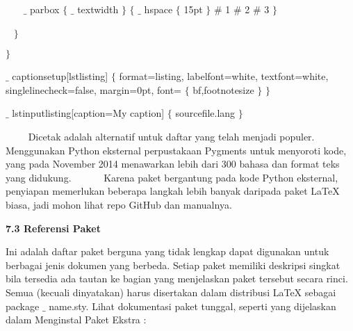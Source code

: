 {\fontsize{10pt}{10pt}\selectfont ~~~  $ \_ $ parbox $ \{ $  $ \_ $ textwidth $ \} $  $ \{ $  $ \_ $ hspace $ \{ $ 15pt $ \} $  $\#$ 1 $\#$ 2 $\#$ 3 $ \} $ }\par

{\fontsize{10pt}{10pt}\selectfont ~  $ \} $ }\par

{\fontsize{10pt}{10pt}\selectfont  $ \} $ }\par

{\fontsize{10pt}{10pt}\selectfont  $ \_ $ captionsetup[lstlisting] $ \{ $  format=listing, labelfont=white, textfont=white, singlelinecheck=false, margin=0pt, font= $ \{ $ bf,footnotesize $ \} $   $ \} $ }\par

{\fontsize{10pt}{10pt}\selectfont  $ \_ $ lstinputlisting[caption=My caption] $ \{ $ sourcefile.lang $ \} $ }\par


\noindent ~~~~ Dicetak adalah alternatif untuk daftar yang telah menjadi populer. Menggunakan Python eksternal perpustakaan Pygments untuk menyoroti kode, yang pada November 2014 menawarkan lebih dari 300 bahasa dan format teks yang didukung.~~~~~~ Karena paket bergantung pada kode Python eksternal, penyiapan memerlukan beberapa langkah lebih banyak daripada paket LaTeX biasa, jadi mohon lihat repo GitHub dan manualnya.\par

\vspace{12pt}
\noindent \textbf{7.3 Referensi Paket}\par
Ini adalah daftar paket berguna yang tidak lengkap dapat digunakan untuk berbagai jenis dokumen yang berbeda. Setiap paket memiliki deskripsi singkat bila tersedia ada tautan ke bagian yang menjelaskan paket tersebut secara rinci. Semua (kecuali dinyatakan) harus disertakan dalam distribusi LaTeX sebagai package $ \_ $ name.sty. Lihat dokumentasi paket tunggal, seperti yang dijelaskan dalam Menginstal Paket Ekstra :\par

